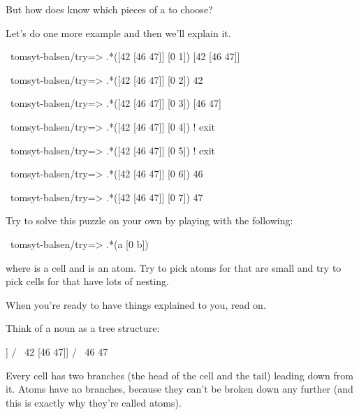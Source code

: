 But how does  \kode{*[a [0 b]]} know which pieces of a to choose? 

Let's do one more example and then we'll explain it.
\begin{code}
~tomsyt-balsen/try=> .*([42 [46 47]] [0 1])
[42 [46 47]] 

~tomsyt-balsen/try=> .*([42 [46 47]] [0 2])
42

~tomsyt-balsen/try=> .*([42 [46 47]] [0 3])
[46 47]

~tomsyt-balsen/try=> .*([42 [46 47]] [0 4])
! exit

~tomsyt-balsen/try=> .*([42 [46 47]] [0 5])
! exit

~tomsyt-balsen/try=> .*([42 [46 47]] [0 6])
46

~tomsyt-balsen/try=> .*([42 [46 47]] [0 7])
47
\end{code}
Try to solve this puzzle on your own by playing with the following:
\begin{code}
~tomsyt-balsen/try=> .*(a [0 b])
\end{code}
where  is a cell and  is an atom. Try to pick atoms for  that are
small and try to pick cells for  that have lots of nesting. 

When you're ready to have things explained to you, read on.

Think of a noun as a tree structure: 
\begin{code}
  [42 [46 47]]
  /       \
42      [46 47]]
          / \ 
        46   47
\end{code}

Every cell has two branches (the head of the cell and the tail) leading down
from it. Atoms have no branches, because they can't be broken down any further
(and this is exactly why they're called atoms).

